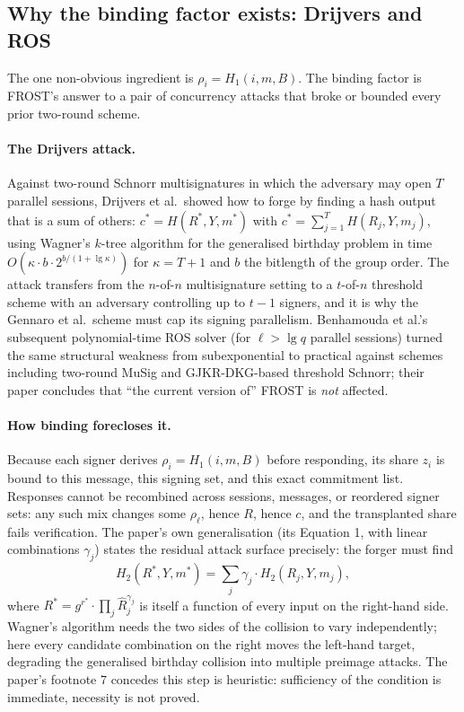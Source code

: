 \documentclass[11pt,a4paper]{article}
\theoremstyle{definition}
\begin{document}
\subsection{Why the binding factor exists: Drijvers and ROS}
\label{sec:fr-binding}

The one non-obvious ingredient is $\rho_i = H_1(i, m, B)$. The binding
factor is FROST's answer to a pair of concurrency attacks that broke or
bounded every prior two-round scheme.

\paragraph{The Drijvers attack.} Against two-round Schnorr multisignatures
in which the adversary may open $T$ parallel sessions, Drijvers et al.\
showed how to forge by finding a hash output that is a sum of others:
$c^* = H(R^*, Y, m^*)$ with $c^* = \sum_{j=1}^{T} H(R_j, Y, m_j)$, using
Wagner's $k$-tree algorithm for the generalised birthday problem in time
$O(\kappa \cdot b \cdot 2^{b/(1 + \lg \kappa)})$ for $\kappa = T + 1$ and
$b$ the bitlength of the group order. The attack transfers from the
$n$-of-$n$ multisignature setting to a $t$-of-$n$ threshold scheme with an
adversary controlling up to $t-1$ signers, and it is why the Gennaro et
al.\ scheme must cap its signing parallelism. Benhamouda et al.'s
subsequent polynomial-time ROS solver (for $\ell > \lg q$ parallel
sessions) turned the same structural weakness from subexponential to
practical against schemes including two-round MuSig and GJKR-DKG-based
threshold Schnorr; their paper concludes that ``the current version of''
FROST is \emph{not} affected.

\paragraph{How binding forecloses it.} Because each signer derives
$\rho_i = H_1(i, m, B)$ before responding, its share $z_i$ is bound to
this message, this signing set, and this exact commitment list. Responses
cannot be recombined across sessions, messages, or reordered signer sets:
any such mix changes some $\rho_\ell$, hence $R$, hence $c$, and the
transplanted share fails verification. The paper's own generalisation (its
Equation 1, with linear combinations $\gamma_j$) states the residual
attack surface precisely: the forger must find
\[
H_2(R^*, Y, m^*) = \sum_{j} \gamma_j \cdot H_2(R_j, Y, m_j),
\]
where $R^* = g^{r^*} \cdot \prod_j \widehat{R}_j^{\gamma_j}$ is itself a
function of every input on the right-hand side. Wagner's algorithm needs
the two sides of the collision to vary independently; here every candidate
combination on the right moves the left-hand target, degrading the
generalised birthday collision into multiple preimage attacks. The paper's
footnote 7 concedes this step is heuristic: sufficiency of the condition
is immediate, necessity is not proved.
\end{document}
